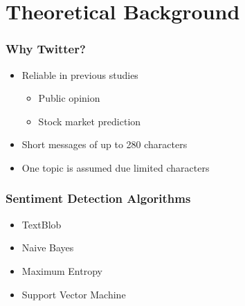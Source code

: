 
\section{Theoretical Background}

\begin{frame}
    \frametitle{Why Twitter?}

    \begin{itemize}
        \item Reliable in previous studies \citep{Barbosa2010}
        \begin{itemize}
            \item Public opinion \citep{Oconnor2010a,Patodkar2016a}
            \item Stock market prediction \citep{Bollen2011a,Mittal2012a,Nguyen2015a,Pagolu2016a,Zhang2011a}
        \end{itemize}

        \item Short messages of up to 280 characters \citep{Rosen2017}
        \item One topic is assumed due limited characters \citep{Pagolu2016a,Patodkar2016a}
    \end{itemize}
\end{frame}
  

\begin{frame}
    \frametitle{Sentiment Detection Algorithms}

    \begin{itemize}
        \item TextBlob
        \item Naive Bayes
        \item Maximum Entropy
        \item Support Vector Machine
    \end{itemize}
\end{frame}



